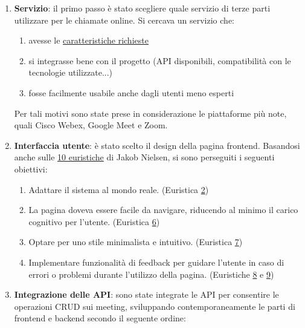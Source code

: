 \begin{enumerate}

   \item \textbf{Servizio}: il primo passo è stato scegliere quale servizio di terze parti utilizzare per le chiamate online. 
   Si cercava un servizio che: 
   
      \begin{enumerate}
         \item avesse le \hyperref[sec:caratteristiche_meeting]{caratteristiche richieste}
         \item si integrasse bene con il progetto (API disponibili, compatibilità con le tecnologie utilizzate...)
         \item fosse facilmente usabile anche dagli utenti meno esperti
      \end{enumerate}
   
   Per tali motivi sono state prese in considerazione le piattaforme più note, quali Cisco Webex, Google Meet e Zoom.
   
   \item \textbf{Interfaccia utente}: è stato scelto il design della pagina frontend. 
   Basandosi anche sulle \hyperref[sec:euristiche_nielsen]{10 euristiche} di Jakob Nielsen, si sono perseguiti i seguenti obiettivi:

   \begin{enumerate}
      \item Adattare il sistema al mondo reale. (Euristica \hyperref[sec:euristiche_nielsen2]{2})
      \item La pagina doveva essere facile da navigare, riducendo al minimo il carico cognitivo per l'utente. 
      (Euristica \hyperref[sec:euristiche_nielsen6]{6})
      \item  Optare per uno stile minimalista e intuitivo. (Euristica \hyperref[sec:euristiche_nielsen7]{7})
      \item Implementare funzionalità di feedback per guidare l'utente in caso di errori o problemi durante l'utilizzo della pagina.
      (Euristiche \hyperref[sec:euristiche_nielsen8]{8} e \hyperref[sec:euristiche_nielsen9]{9})
   \end{enumerate}

   \item \textbf{Integrazione delle API}: sono state integrate le API per consentire le operazioni CRUD sui meeting, 
   sviluppando contemporaneamente le parti di frontend e backend secondo il seguente ordine:


\end{enumerate}
